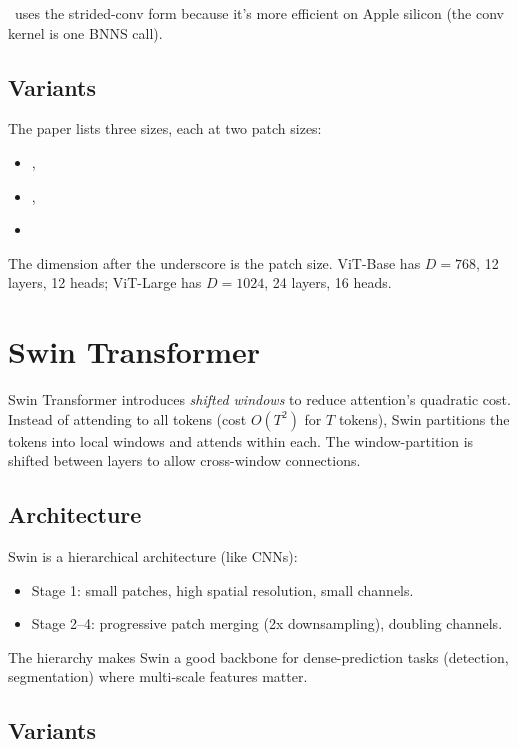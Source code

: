 \Lucid\ uses the strided-conv form because it's more efficient
on Apple silicon (the conv kernel is one BNNS call).

\subsection{Variants}
\label{ssec:vision_transformers:vit_variants}

The paper lists three sizes, each at two patch sizes:
\begin{itemize}
  \item {}, 
  \item {}, 
  \item {}
\end{itemize}

The dimension after the underscore is the patch size. ViT-Base
has $D = 768$, 12 layers, 12 heads; ViT-Large has $D = 1024$,
24 layers, 16 heads.

\section{Swin Transformer}
\label{sec:vision_transformers:swin}

Swin Transformer \cite{liu_swin_2021} introduces \emph{shifted
windows} to reduce attention's quadratic cost. Instead of
attending to all tokens (cost $O(T^2)$ for $T$ tokens), Swin
partitions the tokens into local windows and attends within each.
The window-partition is shifted between layers to allow
cross-window connections.

\subsection{Architecture}
\label{ssec:vision_transformers:swin_arch}

Swin is a hierarchical architecture (like CNNs):
\begin{itemize}
  \item Stage 1: small patches, high spatial resolution, small
    channels.
  \item Stage 2--4: progressive patch merging (2x downsampling),
    doubling channels.
\end{itemize}

The hierarchy makes Swin a good backbone for dense-prediction
tasks (detection, segmentation) where multi-scale features
matter.

\subsection{Variants}
\label{ssec:vision_transformers:swin_variants}

